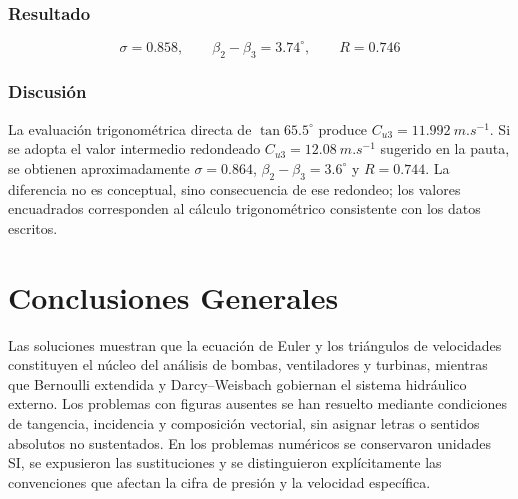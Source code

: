\documentclass[12pt]{article}
\newcommand{\resultado}[1]{\[
  \boxed{\displaystyle #1}
\]}
\begin{document}
\subsubsection*{Resultado}
\resultado{\sigma=0.858,\qquad \beta_2-\beta_3=3.74^\circ,
\qquad R=0.746}

\subsubsection*{Discusión}
La evaluación trigonométrica directa de $\tan65.5^\circ$ produce
$C_{u3}=\SI{11.992}{m.s^{-1}}$. Si se adopta el valor intermedio redondeado
$C_{u3}=\SI{12.08}{m.s^{-1}}$ sugerido en la pauta, se obtienen aproximadamente
$\sigma=0.864$, $\beta_2-\beta_3=3.6^\circ$ y $R=0.744$. La diferencia no es conceptual,
sino consecuencia de ese redondeo; los valores encuadrados corresponden al cálculo
trigonométrico consistente con los datos escritos.

\section*{Conclusiones Generales}
Las soluciones muestran que la ecuación de Euler y los triángulos de velocidades constituyen
el núcleo del análisis de bombas, ventiladores y turbinas, mientras que Bernoulli extendida
y Darcy--Weisbach gobiernan el sistema hidráulico externo. Los problemas con figuras
ausentes se han resuelto mediante condiciones de tangencia, incidencia y composición
vectorial, sin asignar letras o sentidos absolutos no sustentados. En los problemas numéricos
se conservaron unidades SI, se expusieron las sustituciones y se distinguieron explícitamente
las convenciones que afectan la cifra de presión y la velocidad específica.
\end{document}
